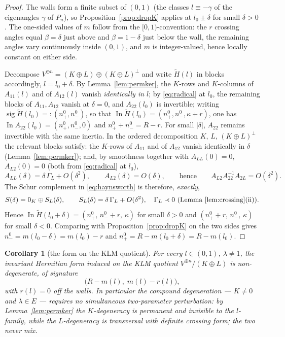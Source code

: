\documentclass[11pt]{article}
\newtheorem{corollary}[theorem]{Corollary}
\theoremstyle{definition}
\newcommand{\Ht}{\widetilde H}
\newcommand{\sig}{\operatorname{sig}}
\begin{document}
\begin{proof}
The walls form a finite subset of $(0,1)$ (the classes
$l\equiv-\gamma$ of the eigenangles $\gamma$ of $P_n$), so
Proposition~\ref{prop:dropK} applies at $l_0\pm\delta$ for small
$\delta>0$. The one-sided values of $m$ follow from the
$[0,1)$-convention: the $r$ crossing angles equal $\beta=\delta$ just
above and $\beta=1-\delta$ just below the wall, the remaining angles
vary continuously inside $(0,1)$, and $m$ is integer-valued, hence
locally constant on either side.

Decompose $V^{\oplus n}=(K\oplus L)\oplus(K\oplus L)^{\perp}$ and
write $\Ht(l)$ in blocks accordingly, $l=l_0+\delta$. By
Lemma~\ref{lem:permker}, the $K$-rows and $K$-columns of $A_{11}(l)$
and of $A_{12}(l)$ vanish \emph{identically in $l$}; by
\eqref{eq:radical} at $l_0$, the remaining blocks of $A_{11},A_{12}$
vanish at $\delta=0$, and $A_{22}(l_0)$ is invertible; writing
$\sig\Ht(l_0)=:(n_+^{0},n_-^{0})$, so that
$\operatorname{In}\Ht(l_0)=(n_+^{0},n_-^{0},\kappa+r)$, one has
$\operatorname{In}A_{22}(l_0)=(n_+^{0},n_-^{0},0)$ and
$n_+^{0}+n_-^{0}=R-r$. For small
$\lvert\delta\rvert$, $A_{22}$ remains invertible with the same
inertia. In the ordered decomposition $K,\,L,\,(K\oplus L)^{\perp}$
the relevant blocks satisfy: the $K$-rows of $A_{11}$ and of $A_{12}$
vanish identically in $\delta$ (Lemma~\ref{lem:permker}); and, by
smoothness together with $A_{LL}(0)=0$, $A_{L2}(0)=0$ (both from
\eqref{eq:radical} at $l_0$),
\[
A_{LL}(\delta)=\delta\,\Gamma_L+O(\delta^{2}),
\qquad
A_{L2}(\delta)=O(\delta),
\qquad\text{hence}\qquad
A_{L2}A_{22}^{-1}A_{2L}=O(\delta^{2}).
\]
The Schur complement in \eqref{eq:haynsworth} is therefore,
\emph{exactly},
\[
S(\delta)=0_{K}\oplus S_{L}(\delta),
\qquad
S_{L}(\delta)=\delta\,\Gamma_L+O(\delta^{2}),
\quad
\Gamma_L\prec0\ \text{(Lemma~\ref{lem:crossing}(ii))}.
\] Hence
$\operatorname{In}\Ht(l_0+\delta)=(n_+^{0},\,n_-^{0}+r,\,\kappa)$ for small
$\delta>0$ and $(n_+^{0}+r,\,n_-^{0},\,\kappa)$ for small $\delta<0$.
Comparing with Proposition~\ref{prop:dropK} on the two sides gives
$n_-^{0}=m(l_0-\delta)=m(l_0)-r$ and
$n_+^{0}=R-m(l_0+\delta)=R-m(l_0)$.
\end{proof}

\begin{corollary}[the form on the KLM quotient]\label{cor:quotsig}
For every $l\in(0,1)$, $\lambda\neq1$, the invariant Hermitian form
induced on the KLM quotient $V^{\oplus n}/(K\oplus L)$ is
non-degenerate, of signature
\[
\bigl(R-m(l),\;m(l)-r(l)\bigr),
\]
with $r(l)=0$ off the walls. In particular the compound degeneration
--- $K\neq0$ \emph{and} $\lambda\in E$ --- requires no simultaneous
two-parameter perturbation: by Lemma~\ref{lem:permker} the
$K$-degeneracy is permanent and invisible to the $l$-family, while the
$L$-degeneracy is transversal with definite crossing form; the two
never mix.
\end{corollary}
\end{document}
